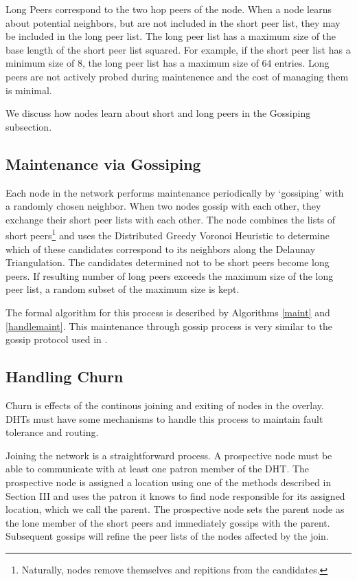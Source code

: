 \documentclass{IEEEtran}
\begin{document}
Long Peers correspond to the two hop peers of the node.
When a node learns about potential neighbors, but are not included in the short peer list, they may be included in the long peer list.  
The long peer list has a maximum size of the base length of the short peer list squared.  
For example, if the short peer list has a minimum size of 8, the long peer list has a maximum size of 64 entries.  
Long peers are not actively probed during maintenence and the cost of managing them is minimal.
 
We discuss how nodes learn about short and long peers in the Gossiping subsection.


\subsection{Maintenance via Gossiping}
Each node in the network performs maintenance periodically by `gossiping' with a randomly chosen neighbor.
When two nodes gossip with each other, they exchange their short peer lists with each other.
The node combines the lists of short peers\footnote{Naturally, nodes remove themselves and repitions from the candidates.} and uses the  Distributed Greedy Voronoi Heuristic to determine which of these candidates correspond to its neighbors along the Delaunay Triangulation.
The candidates determined not to be short peers become long peers.  
If resulting number of long peers exceeds the maximum size of the long peer list, a random subset of the maximum size is kept.

The formal algorithm for this process is described by Algorithms \ref{maint} and \ref{handlemaint}. This maintenance through gossip process is very similar to the gossip protocol used in \cite{raynet}.


\subsection{Handling Churn}
Churn is effects of the continous joining and exiting of nodes in the overlay.
DHTs must have some mechanisms to handle this process to maintain fault tolerance and routing.

Joining the network is a straightforward process.  
A prospective node must be able to communicate with at least one patron member of the DHT.  
The prospective node is assigned a location using one of the methods described in Section III and uses the patron it knows to find node responsible for its assigned location, which we call the parent.
The prospective node sets the parent node as the lone member of the short peers and immediately gossips with the parent.  Subsequent gossips will refine the peer lists of the nodes affected by the join.
\end{document}

